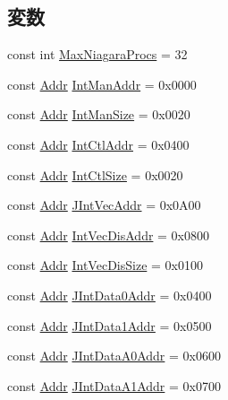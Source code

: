 \subsection*{変数}
\begin{DoxyCompactItemize}
\item 
const int \hyperlink{iob_8hh_ad25d74b9f417cfb77620cab3183e0aba}{MaxNiagaraProcs} = 32
\item 
const \hyperlink{base_2types_8hh_af1bb03d6a4ee096394a6749f0a169232}{Addr} \hyperlink{iob_8hh_a95d5a4a7387bdf8a1d63c371043775af}{IntManAddr} = 0x0000
\item 
const \hyperlink{base_2types_8hh_af1bb03d6a4ee096394a6749f0a169232}{Addr} \hyperlink{iob_8hh_a5419690cae16575305ae94e77c2c8759}{IntManSize} = 0x0020
\item 
const \hyperlink{base_2types_8hh_af1bb03d6a4ee096394a6749f0a169232}{Addr} \hyperlink{iob_8hh_a056f1d0f44791f82cac5fd3964a53c57}{IntCtlAddr} = 0x0400
\item 
const \hyperlink{base_2types_8hh_af1bb03d6a4ee096394a6749f0a169232}{Addr} \hyperlink{iob_8hh_a3274bf1642cc20d550bb8cb53ed2246f}{IntCtlSize} = 0x0020
\item 
const \hyperlink{base_2types_8hh_af1bb03d6a4ee096394a6749f0a169232}{Addr} \hyperlink{iob_8hh_afe4a87237dba89a6790eec415a163ec6}{JIntVecAddr} = 0x0A00
\item 
const \hyperlink{base_2types_8hh_af1bb03d6a4ee096394a6749f0a169232}{Addr} \hyperlink{iob_8hh_af3636c9da997038b8fb502374e7e47c1}{IntVecDisAddr} = 0x0800
\item 
const \hyperlink{base_2types_8hh_af1bb03d6a4ee096394a6749f0a169232}{Addr} \hyperlink{iob_8hh_aa4088245ff5c013bc95ea7082b99f8f3}{IntVecDisSize} = 0x0100
\item 
const \hyperlink{base_2types_8hh_af1bb03d6a4ee096394a6749f0a169232}{Addr} \hyperlink{iob_8hh_a9cb01786d6c3e61c82361b26eec8eca1}{JIntData0Addr} = 0x0400
\item 
const \hyperlink{base_2types_8hh_af1bb03d6a4ee096394a6749f0a169232}{Addr} \hyperlink{iob_8hh_a387868ad0079a7e75192e953d8939995}{JIntData1Addr} = 0x0500
\item 
const \hyperlink{base_2types_8hh_af1bb03d6a4ee096394a6749f0a169232}{Addr} \hyperlink{iob_8hh_acedc89698c8fc7f055cb878b072065d4}{JIntDataA0Addr} = 0x0600
\item 
const \hyperlink{base_2types_8hh_af1bb03d6a4ee096394a6749f0a169232}{Addr} \hyperlink{iob_8hh_a9922dbde12924a02dab81ef5fdd438bd}{JIntDataA1Addr} = 0x0700
\item 

\end{DoxyCompactItemize}
